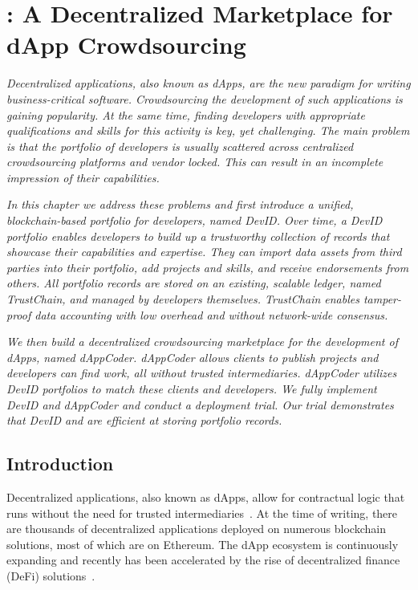\chapter{\Dappcoder{}: A Decentralized Marketplace for dApp Crowdsourcing}
\label{chapter:devid}

\emph{Decentralized applications, also known as dApps, are the new paradigm for writing business-critical software.
Crowdsourcing the development of such applications is gaining popularity.
At the same time, finding developers with appropriate qualifications and skills for this activity is key, yet challenging.
The main problem is that the portfolio of developers is usually scattered across centralized crowdsourcing platforms and vendor locked.
This can result in an incomplete impression of their capabilities.}

\emph{In this chapter we address these problems and first introduce a unified, blockchain-based portfolio for developers, named \emph{DevID}.
Over time, a DevID portfolio enables developers to build up a trustworthy collection of records that showcase their capabilities and expertise.
They can import data assets from third parties into their portfolio, add projects and skills, and receive endorsements from others.
All portfolio records are stored on an existing, scalable ledger, named TrustChain, and managed by developers themselves.
TrustChain enables tamper-proof data accounting with low overhead and without network-wide consensus.}

\emph{We then build a decentralized crowdsourcing marketplace for the development of dApps, named \emph{dAppCoder}.
dAppCoder allows clients to publish projects and developers can find work, all without trusted intermediaries.
dAppCoder utilizes DevID portfolios to match these clients and developers.
We fully implement DevID and dAppCoder and conduct a deployment trial.
Our trial demonstrates that DevID and \Dappcoder{} are efficient at storing portfolio records. }

\newpage

\section{Introduction}
Decentralized applications, also known as dApps, allow for contractual logic that runs without the need for trusted intermediaries~\cite{raval2016decentralized}.
At the time of writing, there are thousands of decentralized applications deployed on numerous blockchain solutions, most of which are on Ethereum.
The dApp ecosystem is continuously expanding and recently has been accelerated by the rise of decentralized finance (DeFi) solutions~\cite{zetzsche2020decentralized}.

